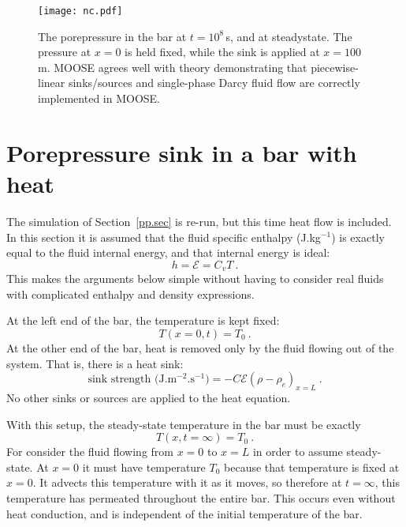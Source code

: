 \documentclass[]{scrreprt}
\begin{document}
\begin{figure}[htb]
\begin{center}
\texttt{[image: nc.pdf]}
\caption{The porepressure in the bar at $t=10^{8}$\,s, and at
  steadystate.  The pressure at $x=0$ is held fixed, while the sink is
  applied at $x=100$\,m.  MOOSE agrees well with theory demonstrating
  that piecewise-linear sinks/sources and single-phase Darcy fluid
  flow are correctly implemented in MOOSE.}
\label{nc.fig}
\end{center}
\end{figure}


\chapter{Porepressure sink in a bar with heat}
\label{pp.heat.sec}

The simulation of Section~\ref{pp.sec} is re-run, but this time
heat flow is included.  In this section it is assumed that the fluid
specific enthalpy (J.kg$^{-1}$) is exactly equal to the fluid internal
energy, and that internal energy is ideal:
\begin{equation}
h = {\mathcal E} = C_{v}T \ .
\end{equation}
This makes the arguments below simple without having to consider real
fluids with complicated enthalpy and density expressions.

At the left end of the bar, the temperature is kept fixed:
\begin{equation}
T(x=0, t) = T_{0} \ .
\end{equation}
At the other end of the bar, heat is removed only by the fluid flowing
out of the system.  That is, there is a heat sink:
\begin{equation}
\mbox{sink strength (J.m$^{-2}$.s$^{-1}$)} = -C {\mathcal E}\left(\rho -
\rho_{e}\right)_{x=L} \ .
\end{equation}
No other sinks or sources are applied to the heat equation.

With this setup, the steady-state temperature in the bar must be
exactly
\begin{equation}
T(x, t=\infty) = T_{0} \ .
\end{equation}
For consider the fluid flowing from $x=0$ to $x=L$ in order to assume
steady-state.  At $x=0$ it must have temperature $T_{0}$ because that
temperature is fixed at $x=0$.  It advects this temperature with it as
it moves, so therefore at $t=\infty$, this temperature has permeated
throughout the entire bar.  This occurs even without heat conduction,
and is independent of the initial temperature of the bar.
\end{document}
